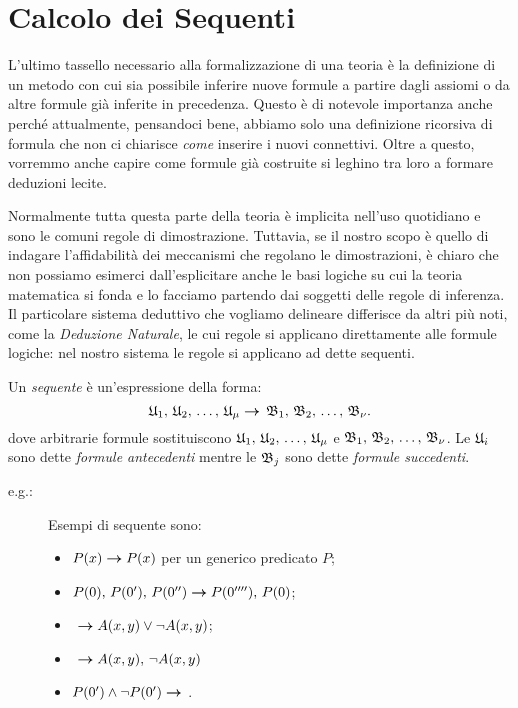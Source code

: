 \section{Calcolo dei Sequenti}
		L'ultimo tassello necessario alla formalizzazione di una teoria è la definizione di un metodo con cui sia possibile inferire nuove formule a partire dagli assiomi o da altre formule già inferite in precedenza. Questo è di notevole importanza anche perché attualmente, pensandoci bene, abbiamo solo una definizione ricorsiva di formula che non ci chiarisce \emph{come} inserire i nuovi connettivi. Oltre a questo, vorremmo anche capire come formule già costruite si leghino tra loro a formare deduzioni lecite. 
		
		Normalmente tutta questa parte della teoria è implicita nell'uso quotidiano e sono le comuni regole di dimostrazione. Tuttavia, se il nostro scopo è quello di indagare l'affidabilità dei meccanismi che regolano le dimostrazioni, è chiaro che non possiamo esimerci dall'esplicitare anche le basi logiche su cui la teoria matematica si fonda e lo facciamo partendo dai soggetti delle regole di inferenza. Il particolare sistema deduttivo che vogliamo delineare differisce da altri più noti, come la \textit{Deduzione Naturale}, le cui regole si applicano direttamente alle formule logiche: nel nostro sistema le regole  si applicano ad  dette sequenti.
	\begin{defin}[Sequente]
		Un \emph{sequente} è un'espressione della forma:
	\begin{equation} 
		\mathfrak{U}_{1},\, \mathfrak{U}_{2},\, \ldots, \, \mathfrak{U}_{\mu} \bm{\rightarrow} \, \mathfrak{B}_{1},\, \mathfrak{B}_{2},\, \ldots, \, \mathfrak{B}_{\nu}. \nonumber
	\end{equation}
		dove arbitrarie formule sostituiscono $\mathfrak{U}_{1},\, \mathfrak{U}_{2},\, \ldots, \, \mathfrak{U}_{\mu}$ e $\mathfrak{B}_{1},\, \mathfrak{B}_{2},\, \ldots, \, \mathfrak{B}_{\nu}$. Le $\mathfrak{U}_{i}$ sono dette \emph{formule antecedenti} mentre le $\mathfrak{B}_{j}$ sono dette \emph{formule succedenti}.
	\end{defin}
	\begin{description}
		\item[e.g.:] Esempi di sequente sono: 
		\begin{itemize}
			\item $P(x)\bm{\rightarrow} P(x)$ per un generico predicato $P$;
			\item $P(0),\, P(0'),\, P(0'') \bm{\rightarrow} P(0''''),\, P(0)$;
			\item $\ \bm{\rightarrow} A(x,y) \lor \neg A(x,y)$;
			\item $\ \bm{\rightarrow} A(x,y),\, \neg A(x,y)$
			\item $P(0')\ee\nn P(0')\seq\ $.
		\end{itemize}
	\end{description}
